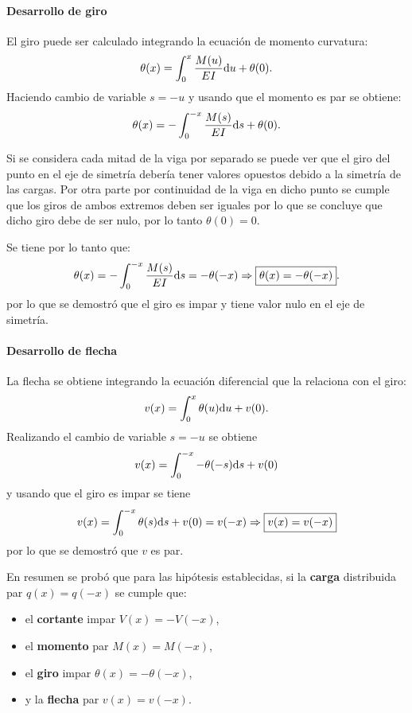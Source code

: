 \paragraph{Desarrollo de giro}
El giro puede ser calculado integrando la ecuación de momento curvatura:
%
\begin{equation}
\theta(x) = \int_{0}^{x} \frac{ M(u)}{EI} {\text{d}} u + \theta(0).
\end{equation}
%
Haciendo cambio de variable $s=-u$ y usando que el momento es par se obtiene:
\begin{equation}
\theta(x) = - \int_{0}^{-x} \frac{ M(s)}{EI} {\text{d}} s + \theta(0).
\end{equation}

Si se considera cada mitad de la viga por separado se puede ver que el giro del punto en el eje de simetría debería tener valores opuestos debido a la simetría de las cargas. %
%
Por otra parte por continuidad de la viga en dicho punto se cumple que los giros de ambos extremos deben ser iguales por lo que se concluye que dicho giro debe de ser nulo, por lo tanto $\theta(0) = 0$. 

Se tiene por lo tanto que:
%
\begin{equation}
  \theta(x) = - \int_{0}^{-x} \frac{ M(s)}{EI} {\text{d}} s =  -\theta(-x) \Rightarrow \boxed{\theta(x) = -\theta(-x)}.
\end{equation}
por lo que se demostró que el giro es impar y tiene valor nulo en el eje de simetría.

\paragraph{Desarrollo de flecha}
La flecha se obtiene integrando la ecuación diferencial que la relaciona con el giro:
%
\begin{equation}
v(x) = \int_{0}^{x} \theta(u) {\text{d}} u + v(0).
\end{equation}
%
Realizando el cambio de variable $s=-u$ se obtiene
\begin{equation}
v(x) = \int_{0}^{-x} -\theta(-s) {\text{d}} s + v(0)
\end{equation}
y usando que el giro es impar se tiene
\begin{equation}
v(x) = \int_{0}^{-x} \theta(s) {\text{d}} s + v(0) = v(-x)
\Rightarrow \boxed{
	v(x) = v(-x)
}
\end{equation}
por lo que se demostró que $v$ es par.

En resumen se probó que para las hipótesis establecidas, si la \textbf{carga} distribuida par $q(x) = q(-x)$ se cumple que: 
\begin{itemize}
	\item el \textbf{cortante} impar $V(x) = -V(-x)$,
	\item el \textbf{momento} par $M(x) = M(-x)$,
	\item el \textbf{giro} impar $\theta(x) = -\theta(-x)$,
	\item y la \textbf{flecha} par $v(x) = v(-x)$.
\end{itemize}


